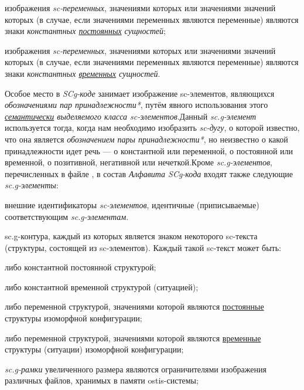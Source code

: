 \begin{SCn}
\begin{scnstruct}
\begin{scnsubstruct}
{\begin{scnitemize}
            \item изображения \textit{sc-переменных}, значениями которых или значениями значений которых (в случае, если значениями переменных являются переменные) являются знаки \textit{константных \uline{постоянных} сущностей};
            \item изображения \textit{sc-переменных}, значениями которых или значениями значений которых (в случае, если значениями переменных являются переменные) являются знаки \textit{константных \uline{временных} сущностей}.
            \end{scnitemize}
            Особое место в \textit{SCg-коде} занимает изображение sc-элементов, являющихся \textit{обозначениями пар принадлежности*}, путём явного использования этого \textit{\uline{семантически} выделяемого класса sc-элементов}.Данный \textit{sc.g-элемент} используется тогда, когда нам необходимо изобразить \textit{sc-дугу}, о которой известно, что она является \textit{обозначением пары принадлежности*}, но неизвестно о какой принадлежности идет речь --- о константной или переменной, о постоянной или временной, о позитивной, негативной или нечеткой.Кроме\textit{ sc.g-элементов}, перечисленных в файле , в состав \textit{Алфавита SCg-кода} входят также следующие \textit{sc.g-элементы}:
            \begin{scnitemize}
            \item внешние идентификаторы \textit{sc-элементов}, идентичные (приписываемые) соответствующим \textit{sc.g-элементам}. 
            \item sc.g-контура, каждый из которых является знаком некоторого sc-текста (структуры, состоящей из sc-элементов). Каждый такой sc-текст может быть:
                \begin{scnitemizeii}
                \item либо константной постоянной структурой;
                \item либо константной временной структурой (ситуацией);
                \item либо переменной структурой, значениями которой являются \uline{постоянные} структуры изоморфной  конфигурации;
                \item либо переменной структурой, значениями которой являются \uline{временные} структуры (ситуации) изоморфной  конфигурации;
                \end{scnitemizeii}
            \item \textit{sc.g-рамки} увеличенного размера являются ограничителями изображения различных файлов, хранимых в памяти ostis-системы; 

\end{scnitemize}}
\end{scnsubstruct}
\end{scnstruct}
\end{SCn}
